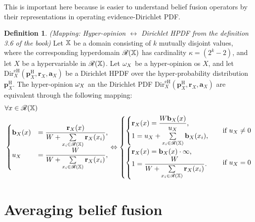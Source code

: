 \documentclass[a4paper,12pt]{article}
\theoremstyle{definition}
\newtheorem{definition}{Definition}[section]
\theoremstyle{theorem}
\numberwithin{equation}{section}
\begin{document}
This is important here because is easier to understand belief fusion operators by their representations in operating evidence-Dirichlet PDF.

\begin{definition}
\emph{(Mapping: Hyper-opinion $\leftrightarrow$ Dirichlet HPDF from the definition 3.6 of the book)} Let $\mathbb{X}$ be a domain consisting of $k$ mutually disjoint values, where the corresponding hyperdomain $\mathcal{R}(\mathbb{X})$ has cardinality $\kappa = (2^{k} - 2)$, and let $X$ be a hypervariable in $\mathcal{R}(\mathbb{X})$. Let $\omega_{X}$ be a hyper-opinion os $X$, and let $\mathrm{Dir}^{\mathrm{eH}}_X(\mathbf{p}^{\mathrm{H}}_X, \mathbf{r}_X, \mathbf{a}_X)$ be a Dirichlet HPDF over the hyper-probability distribution $\mathbf{p}^{\mathrm{H}}_X$. The hyper-opinion $\omega_{X}$ an the Dirichlet PDF $\mathrm{Dir}^{\mathrm{eH}}_X(\mathbf{p}^{\mathrm{H}}_X, \mathbf{r}_X, \mathbf{a}_X)$ are equivalent through the following mapping:
\begin{equation}
\begin{split}
& \forall x \in \mathcal{R}(\mathbb{X}) \\
& \begin{cases}
\mathbf{b}_{X}(x) & = \dfrac{\mathbf{r}_X(x)}{W + \sum\limits_{x_i \in \mathcal{R}(\mathbb{X})} \mathbf{r}_X(x_i)} \text{,} \\
u_X & = \dfrac{W}{W + \sum\limits_{x_i \in \mathcal{R}(\mathbb{X})} \mathbf{r}_X(x_i)} \text{,}
\end{cases} \Leftrightarrow
\begin{cases}
\begin{cases}
\mathbf{r}_X(x) = \dfrac{W \mathbf{b}_{X}(x)}{u_X} \text{,} \\
1 = u_X + \sum\limits_{x_i \in \mathcal{R}(\mathbb{X})} \mathbf{b}_{X}(x_i) \text{,}
\end{cases} & \text{if } u_X \neq 0 \\
\begin{cases}
\mathbf{r}_X(x) = \mathbf{b}_{X}(x) \cdot \infty \text{,} \\
1 = \dfrac{W}{W + \sum\limits_{x_i \in \mathcal{R}(\mathbb{X})} \mathbf{r}_X(x_i)} \text{.}
\end{cases} & \text{if } u_X = 0
\end{cases}
\end{split}
\end{equation}
\end{definition}


\section{Averaging belief fusion}
\end{document}
